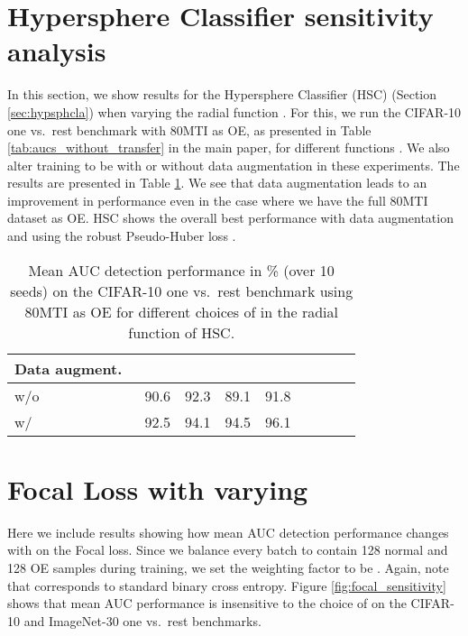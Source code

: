 \documentclass[10pt]{article} \usepackage[accepted]{stylefiles/tmlr}
\begin{document}
\section{Hypersphere Classifier sensitivity analysis}
\label{appx:losses}
In this section, we show results for the Hypersphere Classifier (HSC) (Section \ref{sec:hypsphcla}) when varying the radial function .
For this, we run the CIFAR-10 one vs.~rest benchmark with 80MTI as OE, as presented in Table \ref{tab:aucs_without_transfer} in the main paper, for different functions .
We also alter training to be with or without data augmentation in these experiments.
The results are presented in Table \ref{tab:loss_sensitivity}.
We see that data augmentation leads to an improvement in performance even in the case where we have the full 80MTI dataset as OE.
HSC shows the overall best performance with data augmentation and using the robust Pseudo-Huber loss .

\begin{table}[ht]
  \caption{Mean AUC detection performance in \% (over 10 seeds) on the CIFAR-10 one vs.~rest benchmark using 80MTI as OE for different choices of  in the radial function  of HSC.}
  \label{tab:loss_sensitivity}
  \begin{center}
    \small
    \begin{tabular}{lcccccccc}
    \toprule
    Data augment.\       &  &  &  &  \\
    \midrule
    w/o                     & 90.6 & 92.3 & 89.1 & 91.8 \\
    w/                      & 92.5 & 94.1 & 94.5 & 96.1 \\
    \bottomrule
\end{tabular}   \end{center}
\end{table}







\section{Focal Loss with varying \texorpdfstring{}{TEXT}} 
\label{appx:focal}
Here we include results showing how mean AUC detection performance changes with  on the Focal loss.
Since we balance every batch to contain 128 normal and 128 OE samples during training, we set the weighting factor  to be  \citep{lin17}.
Again, note that  corresponds to standard binary cross entropy.
Figure \ref{fig:focal_sensitivity} shows that mean AUC performance is insensitive to the choice of  on the CIFAR-10 and ImageNet-30 one vs.~rest benchmarks.
\end{document}
